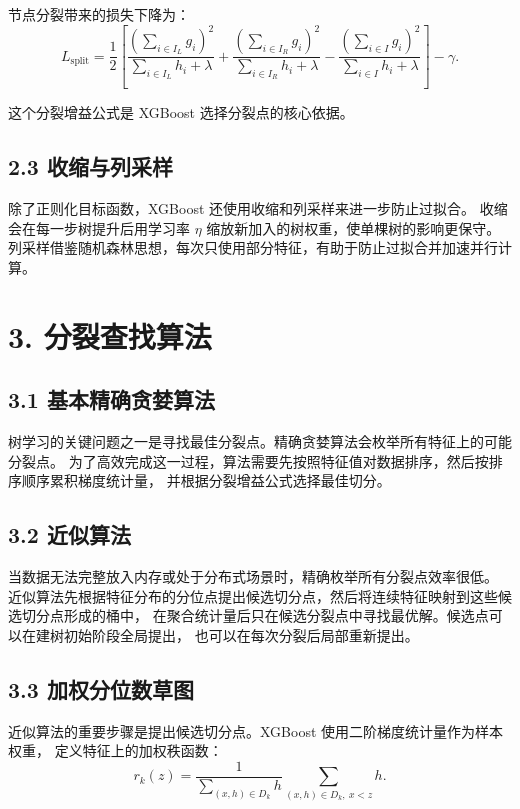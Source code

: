 节点分裂带来的损失下降为：
\[
  L_{\mathrm{split}}
  =
  \frac{1}{2}
  \left[
    \frac{\left(\sum_{i\in I_L}g_i\right)^2}{\sum_{i\in I_L}h_i+\lambda}
    +
    \frac{\left(\sum_{i\in I_R}g_i\right)^2}{\sum_{i\in I_R}h_i+\lambda}
    -
    \frac{\left(\sum_{i\in I}g_i\right)^2}{\sum_{i\in I}h_i+\lambda}
  \right]
  -
  \gamma.
\]

这个分裂增益公式是 XGBoost 选择分裂点的核心依据。

\subsection{2.3 收缩与列采样}

除了正则化目标函数，XGBoost 还使用收缩和列采样来进一步防止过拟合。
收缩会在每一步树提升后用学习率 $\eta$ 缩放新加入的树权重，使单棵树的影响更保守。
列采样借鉴随机森林思想，每次只使用部分特征，有助于防止过拟合并加速并行计算。

\section{3. 分裂查找算法}

\subsection{3.1 基本精确贪婪算法}

树学习的关键问题之一是寻找最佳分裂点。精确贪婪算法会枚举所有特征上的可能分裂点。
为了高效完成这一过程，算法需要先按照特征值对数据排序，然后按排序顺序累积梯度统计量，
并根据分裂增益公式选择最佳切分。

\subsection{3.2 近似算法}

当数据无法完整放入内存或处于分布式场景时，精确枚举所有分裂点效率很低。
近似算法先根据特征分布的分位点提出候选切分点，然后将连续特征映射到这些候选切分点形成的桶中，
在聚合统计量后只在候选分裂点中寻找最优解。候选点可以在建树初始阶段全局提出，
也可以在每次分裂后局部重新提出。

\subsection{3.3 加权分位数草图}

近似算法的重要步骤是提出候选切分点。XGBoost 使用二阶梯度统计量作为样本权重，
定义特征上的加权秩函数：
\[
  r_k(z)
  =
  \frac{1}{\sum_{(x,h)\in D_k}h}
  \sum_{(x,h)\in D_k,\ x<z}h.
\]

